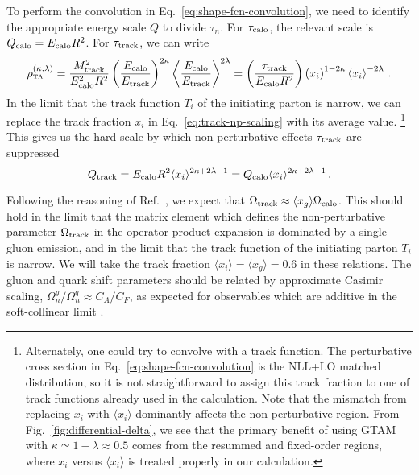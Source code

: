 \documentclass[letterpaper,11pt]{article}
\newcommand{\Ref}[1]{Ref.~\cite{#1}}
\newcommand{\Fig}[1]{Fig.~\ref{#1}}
\newcommand{\Eq}[1]{Eq.~\eqref{#1}}
\begin{document}
To perform the convolution in \Eq{eq:shape-fcn-convolution}, we need to identify the appropriate energy scale $Q$ to divide $\tau_n$. 
%
For $\tau_{\rm calo}$, the relevant scale is $Q_{\rm calo} = E_{\rm calo}R^2$. 
%
For $\tau_{\rm track}$, we can write
\begin{equation}
\label{eq:track-np-scaling}
\rho_{\mbox{\tiny TA}}^{(\kappa,\lambda)} =  \frac{M_{\rm track}^2}{E_{\rm calo}^2R^2} \left(\frac{E_{\rm calo}}{E_{\rm track}}\right)^{2\kappa} \left\langle \frac{E_{\rm calo}}{E_{\rm track}} \right\rangle^{2\lambda}=  \left(\frac{\tau_{\rm track}}{E_{\rm calo}R^2}\right)\left(x_i\right)^{1-2\kappa} \left\langle x_i \right\rangle^{-2\lambda}\,.
\end{equation}
In the limit that the track function $T_i$ of the initiating parton is narrow, we can replace the track fraction $x_i$ in \Eq{eq:track-np-scaling} with its average value.%
%
\footnote{Alternately, one could try to convolve with a track function. The perturbative cross section in \Eq{eq:shape-fcn-convolution} is the NLL+LO matched distribution, so it is not straightforward to assign this track fraction to one of track functions already used in the calculation.  Note that the mismatch from replacing $x_i$ with $\langle x_i \rangle$ dominantly affects the non-perturbative region.  From \Fig{fig:differential-delta}, we see that the primary benefit of using GTAM with $\kappa \simeq 1- \lambda \approx 0.5$ comes from the resummed and fixed-order regions, where $x_i$ versus $\langle x_i \rangle$ is treated properly in our calculation.}
%
This gives us the hard scale by which non-perturbative effects $\tau_{\rm track}$ are suppressed
\begin{equation}
Q_{\rm track} = E_{\rm calo}R^2\langle x_i\rangle^{2\kappa + 2\lambda -1} = Q_{\rm calo} \langle x_i\rangle^{2\kappa + 2\lambda -1}\,.
\end{equation}


Following the reasoning of \Ref{Chang:2013iba}, we expect that $\Omega_{\rm track} \approx \langle x_g \rangle \Omega_{\rm calo}$. 
%
This should hold in the limit that the matrix element which defines the non-perturbative parameter $\Omega_{\rm track}$ in the operator product expansion is dominated by a single gluon emission, and in the limit that the track function of the initiating parton $T_i$ is narrow.
%
We will take the track fraction $\langle x_i \rangle = \langle x_g \rangle = 0.6$ in these relations. 
%
The gluon and quark shift parameters should be related by approximate Casimir scaling, $\Omega_n^g/\Omega_n^q \approx C_A/C_F$, as expected for observables which are additive in the soft-collinear limit \cite{Larkoski:2013eya,Gras:2017jty}.
\end{document}
